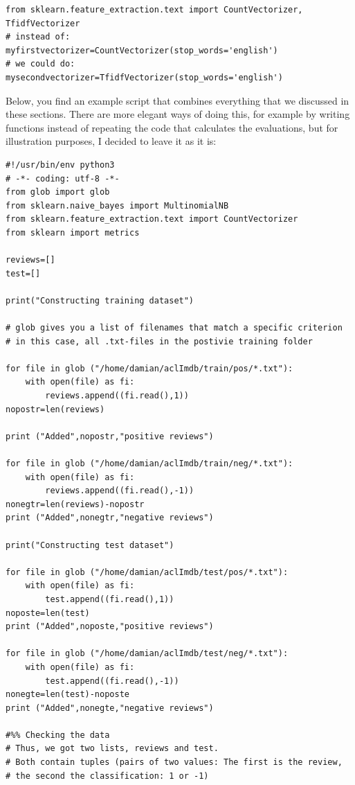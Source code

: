 \documentclass[a4paper,12pt]{book}
\begin{document}
\begin{lstlisting}
from sklearn.feature_extraction.text import CountVectorizer, TfidfVectorizer
# instead of:
myfirstvectorizer=CountVectorizer(stop_words='english')
# we could do:
mysecondvectorizer=TfidfVectorizer(stop_words='english')
\end{lstlisting}

Below, you find an example script that combines everything that we discussed in these sections. There are more elegant ways of doing this, for example by writing functions instead of repeating the code that calculates the evaluations, but for illustration purposes, I decided to leave it as it is:




\begin{lstlisting}
#!/usr/bin/env python3
# -*- coding: utf-8 -*-
from glob import glob
from sklearn.naive_bayes import MultinomialNB
from sklearn.feature_extraction.text import CountVectorizer
from sklearn import metrics

reviews=[]
test=[]

print("Constructing training dataset")

# glob gives you a list of filenames that match a specific criterion
# in this case, all .txt-files in the postivie training folder

for file in glob ("/home/damian/aclImdb/train/pos/*.txt"):
    with open(file) as fi:
        reviews.append((fi.read(),1))
nopostr=len(reviews)

print ("Added",nopostr,"positive reviews")  

for file in glob ("/home/damian/aclImdb/train/neg/*.txt"):
    with open(file) as fi:
        reviews.append((fi.read(),-1))
nonegtr=len(reviews)-nopostr
print ("Added",nonegtr,"negative reviews")  
   
print("Constructing test dataset")

for file in glob ("/home/damian/aclImdb/test/pos/*.txt"):
    with open(file) as fi:
        test.append((fi.read(),1))
noposte=len(test)
print ("Added",noposte,"positive reviews")  

for file in glob ("/home/damian/aclImdb/test/neg/*.txt"):
    with open(file) as fi:
        test.append((fi.read(),-1))
nonegte=len(test)-noposte
print ("Added",nonegte,"negative reviews")  

#%% Checking the data
# Thus, we got two lists, reviews and test.
# Both contain tuples (pairs of two values: The first is the review, 
# the second the classification: 1 or -1)
    

\end{lstlisting}
\end{document}
